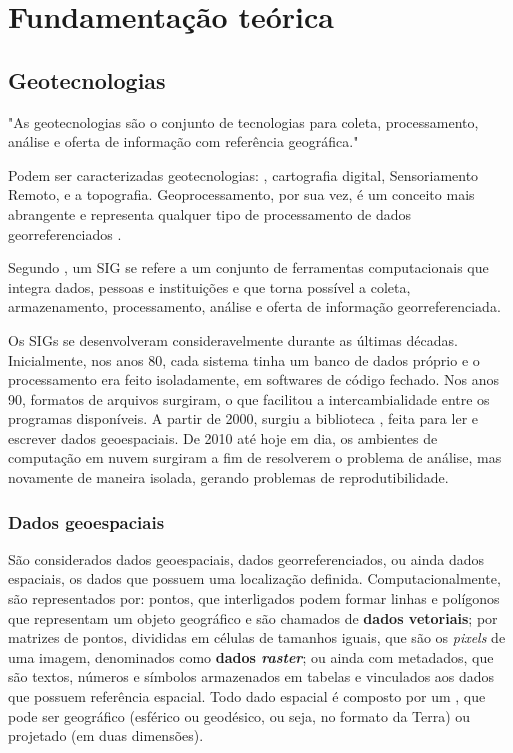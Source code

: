 \chapter{Fundamentação teórica}\label{fundamentacao-teorica}

\section{Geotecnologias}\label{geotecnologias}

\begin{citacao}
"As geotecnologias são o conjunto de tecnologias para coleta,
processamento, análise e oferta de informação com referência geográfica." \cite{rosa2005geotecnologias}
\end{citacao}

Podem ser caracterizadas geotecnologias: , cartografia digital, Sensoriamento Remoto,
 e a topografia. Geoprocessamento,
por sua vez, é um conceito mais abrangente e representa qualquer tipo de
processamento de dados georreferenciados \cite{rosa2005geotecnologias}. 

Segundo \cite{rosa2005geotecnologias}, um \acs{SIG} se refere a um conjunto de ferramentas computacionais que integra dados, pessoas e instituições e que torna possível a coleta, armazenamento, processamento, análise e oferta de informação georreferenciada.

Os \acs{SIG}s se desenvolveram consideravelmente durante as últimas décadas.
Inicialmente, nos anos 80, cada sistema tinha um banco de dados próprio
e o processamento era feito isoladamente, em softwares de código
fechado. Nos anos 90, formatos de arquivos surgiram, o que facilitou a
intercambialidade entre os programas disponíveis. A partir de 2000,
surgiu a biblioteca ,
feita para ler e escrever dados geoespaciais. De 2010 até hoje em dia,
os ambientes de computação em nuvem surgiram a fim de resolverem o
problema de análise, mas novamente de maneira isolada, gerando problemas
de reprodutibilidade. \cite{openeo}

\subsection{Dados geoespaciais}\label{dados-geoespaciais}

São considerados dados geoespaciais, dados georreferenciados, ou ainda
dados espaciais, os dados que possuem uma localização definida.
Computacionalmente, são representados por: pontos, que interligados
podem formar linhas e polígonos que representam um objeto geográfico e
são chamados de \textbf{dados vetoriais}; por matrizes de pontos,
divididas em células de tamanhos iguais, que são os \emph{pixels} de uma
imagem, denominados como \textbf{dados \emph{raster}}; ou ainda com
metadados, que são textos, números e símbolos armazenados em tabelas e
vinculados aos dados que possuem referência espacial. Todo dado espacial
é composto por um , que pode ser geográfico (esférico ou geodésico, ou seja, no formato da Terra) ou projetado (em duas dimensões).\cite{geocompr,ibge-livro}

